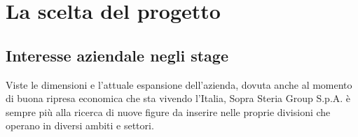 

\chapter{La scelta del progetto}

\section{Interesse aziendale negli stage}

Viste le dimensioni e l'attuale espansione dell'azienda, dovuta anche al momento di buona ripresa economica che sta vivendo l'Italia, Sopra Steria Group S.p.A. è sempre più alla ricerca di nuove figure da inserire nelle proprie divisioni che operano in diversi ambiti e settori.\\

%
%



